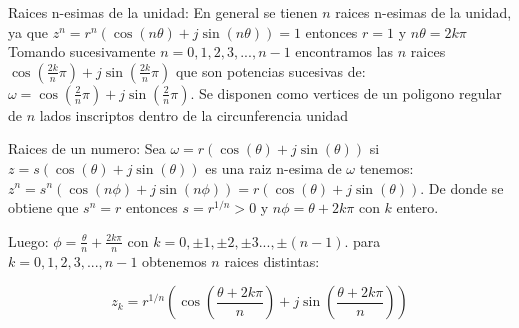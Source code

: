 \begin{defi}{Raices n-esimas de la unidad:}
   En general se tienen $n$ raices n-esimas de la unidad, ya que $z^{n} = r^{n}(\cos(n\theta)+j\sin(n\theta))=1$ entonces $r=1$ y $n\theta=2k\pi$
   Tomando sucesivamente $n=0,1,2,3,...,n-1$ encontramos las $n$ raices $\cos(\frac{2k}{n}\pi)+j\sin(\frac{2k}{n}\pi)$ que son potencias sucesivas de:
   $\omega = \cos(\frac{2}{n}\pi)+j\sin(\frac{2}{n}\pi)$. Se disponen como vertices de un poligono regular de $n$ lados inscriptos dentro de la circunferencia unidad
\end{defi}

\begin{defi}{Raices de un numero:}
   Sea $\omega=r(\cos(\theta)+j\sin(\theta))$ si $z=s(\cos(\theta)+j\sin(\theta))$ es una raiz n-esima de $\omega$ tenemos:
   $z^{n}=s^{n}(\cos(n\phi)+j\sin(n\phi))=r(\cos(\theta)+j\sin(\theta))$. De donde se obtiene que $s^{n}=r$ entonces $s=r^{1/n}>0$ y 
   $n\phi=\theta + 2k\pi$ con $k$ entero.
   
   Luego: $\phi=\frac{\theta}{n}+\frac{2k\pi}{n}$ con $k=0,\pm 1,\pm 2,\pm 3...,\pm (n-1)$. para $k=0,1,2,3,...,n-1$ obtenemos $n$ raices distintas:

   \begin{equation}
      z_{k}=r^{1/n}(\cos(\frac{\theta + 2k\pi}{n})+j\sin(\frac{\theta + 2k\pi}{n}))
   \end{equation}
\end{defi}

